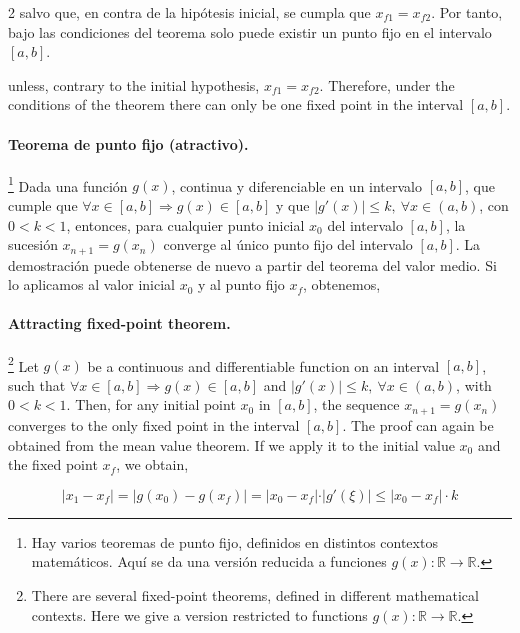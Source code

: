 \begin{paracol}{2}
salvo que, en contra de la hipótesis inicial, se cumpla que $ x_{f1}=x_{f2}$. Por tanto, bajo las condiciones del teorema solo puede existir un punto fijo en el intervalo $[a, b]$.

\switchcolumn
unless, contrary to the initial hypothesis, $ x_{f1}=x_{f2}$. Therefore, under the conditions of the theorem there can only be one fixed point in the interval $[a, b]$.
\switchcolumn

\paragraph{Teorema de punto fijo (atractivo).}\footnote{Hay varios teoremas de punto fijo, definidos en distintos contextos matemáticos. Aquí se da una versión reducida a funciones $g(x):\mathbb{R} \rightarrow \mathbb{R}$.} Dada una función $g(x)$, continua y diferenciable en un intervalo $[a, b]$, que cumple que $\forall x \in [a, b] \Rightarrow g(x)\in [a,b]$ y que $\vert g'(x) \vert \leq k, \  \forall x \in (a, b)$, con $0<k<1$, entonces, para cualquier punto inicial $x_0$ del intervalo $[a, b]$, la sucesión $x_{n+1}=g(x_n)$ converge al único punto fijo del intervalo $[a, b]$.
La demostración puede obtenerse de nuevo a partir del teorema del valor medio. Si lo aplicamos al valor inicial $x_0$ y al punto fijo $x_f$, obtenemos,
\switchcolumn

\paragraph{Attracting fixed-point theorem.}\footnote{There are several fixed-point theorems, defined in different mathematical contexts. Here we give a version restricted to functions $g(x):\mathbb{R} \rightarrow \mathbb{R}$.} Let $g(x)$ be a continuous and differentiable function on an interval $[a, b]$, such that $\forall x \in [a, b] \Rightarrow g(x)\in [a,b]$ and $\vert g'(x) \vert \leq k, \  \forall x \in (a, b)$, with $0<k<1$. Then, for any initial point $x_0$ in $[a, b]$, the sequence $x_{n+1}=g(x_n)$ converges to the only fixed point in the interval $[a, b]$.
The proof can again be obtained from the mean value theorem. If we apply it to the initial value $x_0$ and the fixed point $x_f$, we obtain,

\end{paracol}


\begin{equation*}
\vert x_1-x_f \vert = \vert g(x_0)-g(x_f) \vert =\vert x_0-x_f \vert \cdot \vert g'(\xi) \vert \leq \vert x_0-x_f \vert \cdot k
\end{equation*}

